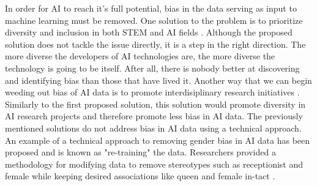 \documentclass[12pt]{article}
\begin{document}
In order for AI to reach it's full potential, bias in the data serving as input to machine learning must be removed. One solution to the problem is to prioritize diversity and inclusion in both STEM and AI fields \cite{gov}. Although the proposed solution does not tackle the issue directly, it is a step in the right direction. The more diverse the developers of AI technologies are, the more diverse the technology is going to be itself. After all, there is nobody better at discovering and identifying bias than those that have lived it. Another way that we can begin weeding out bias of AI data is to promote interdisiplinary research initiatives \cite[pg. 5]{now}. Similarly to the first proposed solution, this solution would promote diversity in AI research projects and therefore promote less bias in AI data. The previously mentioned solutions do not address bias in AI data using a technical approach. An example of a technical approach to removing gender bias in AI data has been proposed and is known as "re-training" the data. Researchers provided a methodology for modifying data to remove stereotypes such as receptionist and female while keeping desired associations like queen and female in-tact \cite{debiasing}. 

\newpage

{}

\end{document}
